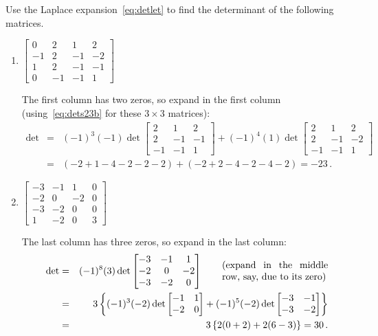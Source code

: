 \begin{example} 
Use the Laplace expansion~\eqref{eq:detlet} to find the determinant of the following matrices.
\begin{enumerate}
\item \(\begin{bmatrix}0&2&1&2
\\-1&2&-1&-2
\\1&2&-1&-1
\\0&-1&-1&1 \end{bmatrix}\)
\begin{solution} 
The first column has two zeros, so expand in the first column (using~\eqref{eq:dets23b} for these \(3\times3\) matrices):
\begin{eqnarray*}
\det&=&(-1)^3(-1)\det\begin{bmatrix}2&1&2
\\2&-1&-1
\\-1&-1&1 \end{bmatrix}
+(-1)^4(1)\det\begin{bmatrix}2&1&2
\\2&-1&-2
\\-1&-1&1 \end{bmatrix}
\\&=&(-2+1-4-2-2-2)
+(-2+2-4-2-4-2)
=-23\,.
\end{eqnarray*}
\end{solution}

\item \(\begin{bmatrix}-3&-1&1&0
\\-2&0&-2&0
\\-3&-2&0&0
\\1&-2&0&3 \end{bmatrix}\)
\begin{solution} 
The last column has three zeros, so expand in the last column:
\begin{eqnarray*}
\det&=&(-1)^8(3)\det\begin{bmatrix}-3&-1&1
\\-2&0&-2
\\-3&-2&0 \end{bmatrix}
\qquad\parbox[c]{11em}{(expand in the middle row, say, due to its zero)}
\\&=&3\left\{ (-1)^3(-2)\det\begin{bmatrix} -1&1\\-2&0 \end{bmatrix}
+(-1)^5(-2)\det\begin{bmatrix} -3&-1\\-3&-2 \end{bmatrix} \right\}
\\&=&3\left\{2(0+2)+2(6-3)\right\}
=30\,.
\end{eqnarray*}
\end{solution}


\end{enumerate}
\end{example}








